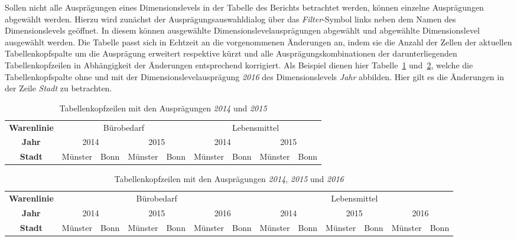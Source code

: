 \documentclass[
  language=german, %
  type=bachelor,%
  ngerman
]{isthesis}
\begin{document}
\begin{content}
  Sollen nicht alle Ausprägungen eines Dimensionslevels in der Tabelle des
  Berichts betrachtet werden, können einzelne Ausprägungen abgewählt werden.
  Hierzu wird zunächst der Ausprägungsauswahldialog über das
  \textit{Filter}-Symbol links neben dem Namen des Dimensionslevels geöffnet.
  In diesem können ausgewählte Dimensionslevelausprägungen abgewählt und abgewählte
  Dimensionslevel ausgewählt werden. Die Tabelle passt sich in Echtzeit an die
  vorgenommenen Änderungen an, indem sie die Anzahl der Zellen der aktuellen
  Tabellenkopfspalte um die Ausprägung erweitert respektive kürzt und alle
  Ausprägungskombinationen der darunterliegenden Tabellenkopfzeilen in
  Abhängigkeit der Änderungen entsprechend korrigiert. Als Beispiel dienen hier
  Tabelle~\ref{table:berichtstabellenkopf20142015}
  und~\ref{table:berichtstabellenkopf201420152016}, welche die Tabellenkopfspalte
  ohne und mit der Dimensionslevelausprägung \textit{2016} des Dimensionslevels
  \textit{Jahr} abbilden. Hier gilt es die Änderungen in der Zeile
  \textit{Stadt} zu betrachten.

    \begin{table}[]
      \footnotesize
      \begin{tabular}{c c c c c c c c c}
        \textbf{Warenlinie} & \multicolumn{4}{c}{Bürobedarf} & \multicolumn{4}{c}{Lebensmittel} \\
            \cmidrule(lr){2-5}\cmidrule(lr){6-9}
        \textbf{Jahr} & \multicolumn{2}{c}{2014} & \multicolumn{2}{c}{2015} & \multicolumn{2}{c}{2014} & \multicolumn{2}{c}{2015}\\
            \cmidrule(lr){2-3}\cmidrule(lr){4-5}\cmidrule(lr){6-7}\cmidrule(lr){8-9}
        \textbf{Stadt} & Münster & Bonn & Münster & Bonn & Münster & Bonn & Münster & Bonn \\
      \end{tabular}
      \caption{Tabellenkopfzeilen mit den Ausprägungen \textit{2014} und \textit{2015}}\label{table:berichtstabellenkopf20142015}
    \end{table}

    \begin{table}
      \footnotesize
      \begin{tabular}{c c c c c c c c c c c c c}
        \textbf{Warenlinie} & \multicolumn{6}{c}{Bürobedarf} & \multicolumn{6}{c}{Lebensmittel} \\
            \cmidrule(lr){2-7}\cmidrule(lr){8-13}
        \textbf{Jahr} & \multicolumn{2}{c}{2014} & \multicolumn{2}{c}{2015} & \multicolumn{2}{c}{2016} & \multicolumn{2}{c}{2014} & \multicolumn{2}{c}{2015} & \multicolumn{2}{c}{2016}\\
            \cmidrule(lr){2-3}\cmidrule(lr){4-5}\cmidrule(lr){6-7}\cmidrule(lr){8-9}\cmidrule(lr){10-11}\cmidrule(lr){12-13}
        \textbf{Stadt} & Münster & Bonn & Münster & Bonn & Münster & Bonn & Münster & Bonn & Münster & Bonn & Münster & Bonn \\
      \end{tabular}
      \caption{Tabellenkopfzeilen mit den Ausprägungen \textit{2014}, \textit{2015} und \textit{2016}}\label{table:berichtstabellenkopf201420152016}
    \end{table}


\end{content}
\end{document}
